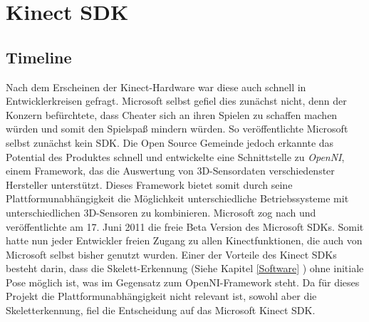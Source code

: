 \section{Kinect SDK}\label{SDK}
%
%
%
%
%
%

	
\subsection{Timeline}
Nach dem Erscheinen der Kinect-Hardware war diese auch schnell in Entwicklerkreisen gefragt. Microsoft selbst gefiel dies zunächst nicht, denn der Konzern befürchtete, dass Cheater sich an ihren Spielen zu schaffen machen würden und somit den Spielspaß mindern würden. So veröffentlichte Microsoft selbst zunächst kein SDK. Die Open Source Gemeinde jedoch erkannte das Potential des Produktes schnell und entwickelte eine Schnittstelle zu \textit{OpenNI}, einem Framework, das die Auswertung von 3D-Sensordaten verschiedenster Hersteller unterstützt. Dieses Framework bietet somit durch seine Plattformunabhängigkeit die Möglichkeit unterschiedliche Betriebssysteme mit unterschiedlichen 3D-Sensoren zu kombinieren.\cite{webb2012beginning}
Microsoft zog nach und veröffentlichte am 17. Juni 2011 die freie Beta Version des Microsoft SDKs. Somit hatte nun jeder Entwickler freien Zugang zu allen Kinectfunktionen, die auch von Microsoft selbst bisher genutzt wurden. Einer der Vorteile des Kinect SDKs besteht darin, dass die Skelett-Erkennung (Siehe Kapitel \ref{Software} ) ohne initiale Pose möglich ist, was im Gegensatz zum OpenNI-Framework steht. \cite{webb2012beginning} Da für dieses Projekt die Plattformunabhängigkeit nicht relevant ist, sowohl aber die Skeletterkennung, fiel die Entscheidung auf das Microsoft Kinect SDK.

